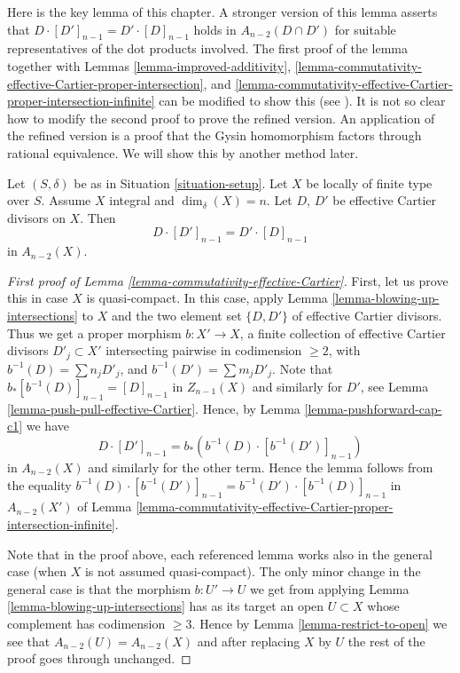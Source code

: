 \noindent
Here is the key lemma of this chapter. A stronger version of this lemma
asserts that $D \cdot [D']_{n - 1} = D' \cdot [D]_{n - 1}$ holds
in $A_{n - 2}(D \cap D')$ for suitable representatives of the
dot products involved. The first proof of the lemma together with
Lemmas \ref{lemma-improved-additivity},
\ref{lemma-commutativity-effective-Cartier-proper-intersection}, and
\ref{lemma-commutativity-effective-Cartier-proper-intersection-infinite}
can be modified to show this (see \cite{F}). It is
not so clear how to modify the second proof to prove the refined
version. An application of the refined version is a proof that the
Gysin homomorphism factors through rational equivalence. We will show
this by another method later.

\begin{lemma}
\label{lemma-commutativity-effective-Cartier}
Let $(S, \delta)$ be as in Situation \ref{situation-setup}.
Let $X$ be locally of finite type over $S$.
Assume $X$ integral and $\dim_\delta(X) = n$.
Let $D$, $D'$ be effective Cartier divisors on $X$.
Then
$$
D \cdot [D']_{n - 1} = D' \cdot [D]_{n - 1}
$$
in $A_{n - 2}(X)$.
\end{lemma}

\begin{proof}[First proof of Lemma \ref{lemma-commutativity-effective-Cartier}]
First, let us prove this in case $X$ is quasi-compact.
In this case, apply Lemma \ref{lemma-blowing-up-intersections} to $X$ and the
two element set $\{D, D'\}$ of effective Cartier divisors.
Thus we get a proper morphism $b : X' \to X$,
a finite collection of effective Cartier
divisors $D'_j \subset X'$ intersecting pairwise in codimension $\geq 2$,
with $b^{-1}(D) = \sum n_j D'_j$, and $b^{-1}(D') = \sum m_j D'_j$.
Note that $b_*[b^{-1}(D)]_{n - 1} = [D]_{n - 1}$ in $Z_{n - 1}(X)$
and similarly for $D'$,
see Lemma \ref{lemma-push-pull-effective-Cartier}.
Hence, by Lemma \ref{lemma-pushforward-cap-c1} we have
$$
D \cdot [D']_{n - 1} = b_*\left(b^{-1}(D) \cdot [b^{-1}(D')]_{n - 1}\right)
$$
in $A_{n - 2}(X)$ and similarly for the other term. Hence the
lemma follows from the equality
$b^{-1}(D) \cdot [b^{-1}(D')]_{n - 1} = b^{-1}(D') \cdot [b^{-1}(D)]_{n - 1}$
in $A_{n - 2}(X')$ of Lemma
\ref{lemma-commutativity-effective-Cartier-proper-intersection-infinite}.

\medskip\noindent
Note that in the proof above, each referenced lemma works also
in the general case (when $X$ is not assumed quasi-compact). The
only minor change in the general case is that the morphism
$b : U' \to U$ we get from applying Lemma \ref{lemma-blowing-up-intersections}
has as its target
an open $U \subset X$ whose complement has codimension $\geq 3$.
Hence by Lemma \ref{lemma-restrict-to-open} we see that
$A_{n - 2}(U) = A_{n - 2}(X)$
and after replacing $X$ by $U$ the rest of the proof goes through
unchanged.
\end{proof}

